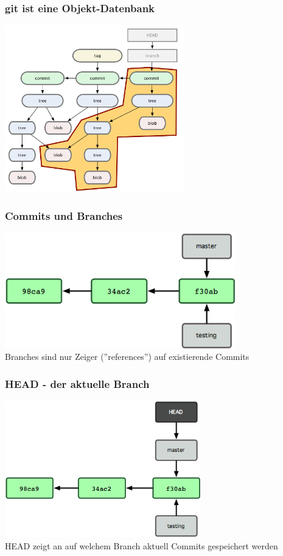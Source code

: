 \begin{frame}
  \frametitle{git ist eine Objekt-Datenbank}
  \begin{center}
    \includegraphics[width=7.8cm]{img/tree_commit.pdf}
  \end{center}
\end{frame}

\begin{frame}
  \frametitle{Commits und Branches}
  \begin{center}
    \includegraphics[width=10cm]{img/two_branches.png} \\
    Branches sind nur Zeiger (''references'') auf existierende Commits
  \end{center}
\end{frame}

\begin{frame}
  \frametitle{HEAD - der aktuelle Branch}
  \begin{center}
    \includegraphics[width=8.5cm]{img/headref.png} \\
    HEAD zeigt an auf welchem Branch aktuell Commits gespeichert werden
  \end{center}
\end{frame}

